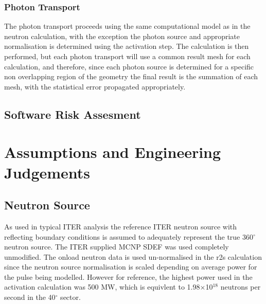 \documentclass[12pt]{article}
\begin{document}
\subsubsection{Photon Transport}
The photon transport proceeds using the same computational model as in the 
neutron calculation, with the exception the photon source and appropriate 
normalisation is determined using the activation step. The calculation is then
performed, but each photon transport will use a common result mesh for each 
calculation, and therefore, since each photon source is determined for a 
specific non overlapping region of the geometry the final result is the 
summation of each mesh, with the statistical error propagated appropriately.
\subsection{Software Risk Assesment}
\clearpage
\newpage
\section{Assumptions and Engineering Judgements}
\subsection{Neutron Source}
As used in typical ITER analysis the reference ITER neutron source with
reflecting boundary conditions is assumed to adequately represent the
true 360$^{\circ}$ neutron source. The ITER supplied MCNP SDEF was used
completely unmodified. The onload neutron data is used un-normalised
in the \gls{r2s} calculation since the neutron source normalisation is scaled
depending on average power for the pulse being modelled. However for reference,
the highest power used in the activation calculation was 500 MW, which is
equivlent to 1.98$\times$10$^{18}$ neutrons per second in the 40$^{\circ}$ sector.
\end{document}
